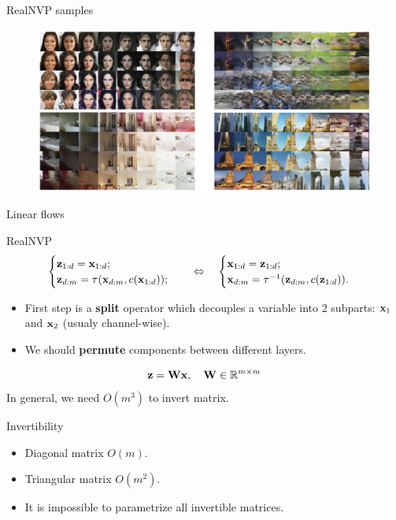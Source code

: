 \begin{frame}{RealNVP samples}
		\begin{figure}
			\centering
			\includegraphics[width=\linewidth]{figs/realnvp_output.png}
		\end{figure}
\end{frame}
\begin{frame}{Linear flows}
	\begin{block}{RealNVP}
		\vspace{-0.5cm}
		\begin{equation*}
			\begin{cases} \mathbf{z}_{1:d} = \mathbf{x}_{1:d}; \\ \mathbf{z}_{d:m} = \tau (\mathbf{x}_{d:m}, c(\mathbf{x}_{1:d}));\end{cases} 
			\quad \Leftrightarrow \quad 
			\begin{cases} \mathbf{x}_{1:d} = \mathbf{z}_{1:d}; \\ \mathbf{x}_{d:m} = \tau^{-1} (\mathbf{z}_{d:m}, c(\mathbf{z}_{1:d})).\end{cases}
		\end{equation*}
		\vspace{-0.2cm}
	\end{block}
	\begin{itemize}
	\item First step is a \textbf{split} operator which decouples a variable into 2 subparts: $\mathbf{x}_1$ and $\mathbf{x}_2$ (usualy channel-wise).
	\item We should \textbf{permute} components between different layers.
	\end{itemize}
	\[
		\mathbf{z} = \mathbf{W} \mathbf{x}, \quad \mathbf{W} \in \mathbb{R}^{m \times m}
	\]
	In general, we need $O(m^3)$ to invert matrix.
	\begin{block}{Invertibility}
		\begin{itemize}
			\item Diagonal matrix $O(m)$.
			\item Triangular matrix $O(m^2)$.
			\item It is impossible to parametrize all invertible matrices.
		\end{itemize}
	\end{block}
\end{frame}
